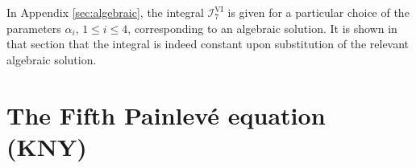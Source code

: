 \documentclass[a4paper,reqno]{amsart}
\numberwithin{equation}{section}
\numberwithin{figure}{section}
\theoremstyle{remark}
\begin{document}
In Appendix \ref{sec:algebraic}, the integral $\mathcal{I}_7^{\textrm{VI}}$ is given for a particular choice of the parameters $\alpha_i$, $1\leq i\leq 4$, corresponding to an algebraic solution. It is shown in that section that the integral is indeed constant upon substitution of the relevant algebraic solution.
























\section{The Fifth Painlev\'e equation (KNY)}\label{sect:p5}
\end{document}

